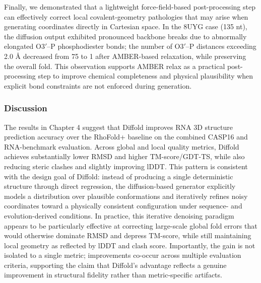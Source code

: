 Finally, we demonstrated that a lightweight force-field-based post-processing step can effectively correct local covalent-geometry pathologies that may arise when generating coordinates directly in Cartesian space. In the 8UYG case (135 nt), the diffusion output exhibited pronounced backbone breaks due to abnormally elongated $\text{O3}'–\text{P}$ phosphodiester bonds; the number of $\text{O3}'–\text{P}$ distances exceeding 2.0 $\text{\AA}$ decreased from 75 to 1 after AMBER-based relaxation, while preserving the overall fold. This observation supports AMBER relax as a practical post-processing step to improve chemical completeness and physical plausibility when explicit bond constraints are not enforced during generation.

\subsubsection{Discussion}

The results in Chapter 4 suggest that Diffold improves RNA 3D structure prediction accuracy over the RhoFold+ baseline on the combined CASP16 and RNA-benchmark evaluation. Across global and local quality metrics, Diffold achieves substantially lower RMSD and higher TM-score/GDT-TS, while also reducing steric clashes and slightly improving lDDT. This pattern is consistent with the design goal of Diffold: instead of producing a single deterministic structure through direct regression, the diffusion-based generator explicitly models a distribution over plausible conformations and iteratively refines noisy coordinates toward a physically consistent configuration under sequence- and evolution-derived conditions. In practice, this iterative denoising paradigm appears to be particularly effective at correcting large-scale global fold errors that would otherwise dominate RMSD and depress TM-score, while still maintaining local geometry as reflected by lDDT and clash score. Importantly, the gain is not isolated to a single metric; improvements co-occur across multiple evaluation criteria, supporting the claim that Diffold’s advantage reflects a genuine improvement in structural fidelity rather than metric-specific artifacts.

